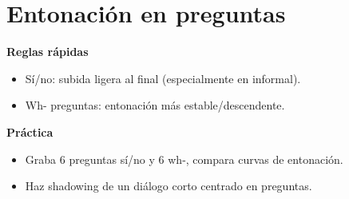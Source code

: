 \section{Entonación en preguntas}
\textbf{Reglas rápidas}
\begin{itemize}[leftmargin=*]
  \item Sí/no: subida ligera al final (especialmente en informal).
  \item Wh- preguntas: entonación más estable/descendente.
\end{itemize}

\textbf{Práctica}
\begin{itemize}[leftmargin=*]
  \item Graba 6 preguntas sí/no y 6 wh-, compara curvas de entonación.
  \item Haz shadowing de un diálogo corto centrado en preguntas.
\end{itemize}

